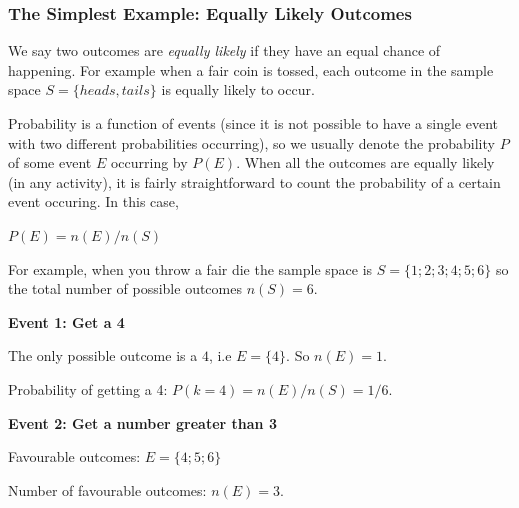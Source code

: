             \subsubsection{ The Simplest Example: Equally Likely Outcomes}
            \nopagebreak
         \label{m39377*eip-953}We say two outcomes are \textsl{equally likely} if they have an equal chance of
happening. For example when a fair coin is tossed, each outcome in the sample
space $S=\{heads,tails\}$ is equally likely to occur.\par \label{m39377*eip-594}Probability is a function of events (since it is not possible to have a single event with two different probabilities occurring), so we usually denote the probability \begin{math}P\end{math} of some event \begin{math}E\end{math} occurring by \begin{math}P\left(E\right)\end{math}. When all the outcomes are equally likely (in any
activity), it is fairly straightforward to count the probability of a certain
event occuring. In this case,\par \label{m39377*eip-56}$P\left(E\right)=n\left(E\right)/n\left(S\right)$\par 
        \label{m39377*eip-525}For example, when you throw a fair die the sample
space is $S=\{1;2;3;4;5;6\}$ so the total number of possible outcomes \begin{math}n\left(S\right)=6\end{math}.\par \label{m39377*id111979}\textbf{Event 1: Get a 4}
        \par 
        \label{m39377*id111985}The only possible outcome is a 
$4$, i.e \begin{math}E=\{4\}\end{math}. So \begin{math}n\left(E\right)=1\end{math}.
\par 
        \label{m39377*id111992}Probability of getting a 4: $P\left(k=4\right)=n\left(E\right)/n\left(S\right)=1/6$.\par 
        \label{m39377*id111998}\textbf{Event 2: Get a number greater than 3}
        \par 
        \label{m39377*id112007}Favourable outcomes: $E=\{4;5;6\}$\par 
        \label{m39377*id112039}Number of favourable outcomes: $n\left(E\right)=3$.\par 
